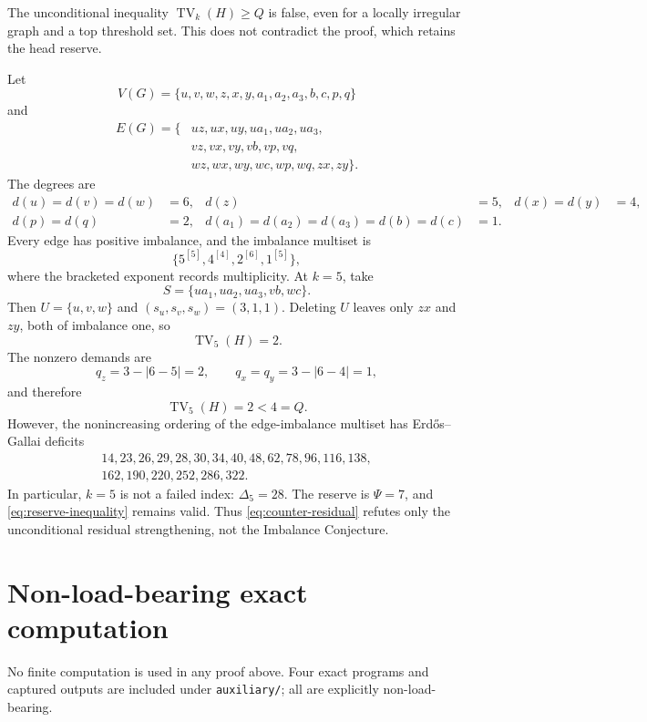 \documentclass[a4paper,11pt]{amsart}
\numberwithin{equation}{section}
\theoremstyle{definition}
\theoremstyle{remark}
\newcommand{\TV}{\operatorname{TV}}
\begin{document}
The unconditional inequality $\TV_k(H)\ge Q$ is false, even for a locally irregular graph and a top threshold set.  This does not contradict the proof, which retains the head reserve.

Let
\[
V(G)=\{u,v,w,z,x,y,a_1,a_2,a_3,b,c,p,q\}
\]
and
\begin{align*}
E(G)=\{&uz,ux,uy,ua_1,ua_2,ua_3,\\
       &vz,vx,vy,vb,vp,vq,\\
       &wz,wx,wy,wc,wp,wq,zx,zy\}.
\end{align*}
The degrees are
\begin{align*}
d(u)=d(v)=d(w)&=6,&d(z)&=5,&d(x)=d(y)&=4,\\
d(p)=d(q)&=2,&d(a_1)=d(a_2)=d(a_3)=d(b)=d(c)&=1.
\end{align*}
Every edge has positive imbalance, and the imbalance multiset is
\[
\{5^{[5]},4^{[4]},2^{[6]},1^{[5]}\},
\]
where the bracketed exponent records multiplicity.  At $k=5$, take
\[
S=\{ua_1,ua_2,ua_3,vb,wc\}.
\]
Then $U=\{u,v,w\}$ and $(s_u,s_v,s_w)=(3,1,1)$.  Deleting $U$ leaves only $zx$ and $zy$, both of imbalance one, so
\[
\TV_5(H)=2.
\]
The nonzero demands are
\[
q_z=3-\lvert6-5\rvert=2,
\qquad
q_x=q_y=3-\lvert6-4\rvert=1,
\]
and therefore
\begin{equation}
\TV_5(H)=2<4=Q.
\label{eq:counter-residual}
\end{equation}
However, the nonincreasing ordering of the edge-imbalance multiset has Erd\H{o}s--Gallai deficits
\[
\begin{gathered}
14,23,26,29,28,30,34,40,48,62,78,96,116,138,\\
162,190,220,252,286,322.
\end{gathered}
\]
In particular, $k=5$ is not a failed index: $\Delta_5=28$.  The reserve is $\Psi=7$, and \eqref{eq:reserve-inequality} remains valid.  Thus \eqref{eq:counter-residual} refutes only the unconditional residual strengthening, not the Imbalance Conjecture.

\section{Non-load-bearing exact computation}\label{app:computation}

No finite computation is used in any proof above.  Four exact programs and captured outputs are included under \texttt{auxiliary/}; all are explicitly non-load-bearing.
\end{document}
